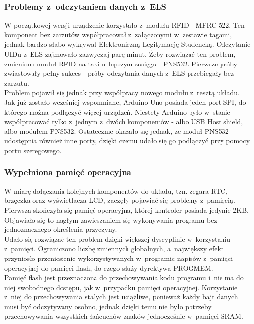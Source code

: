 \documentclass[declaration,shortabstract, mgr]{iithesis}
\begin{document}
\subsubsection{Problemy z~odczytaniem danych z~ELS}
\indent W początkowej wersji urządzenie korzystało z~modułu RFID - MFRC-522. Ten komponent bez zarzutów współpracował z~załączonymi w~zestawie tagami, jednak bardzo słabo wykrywał Elektroniczną Legitymację Studencką. Odczytanie UIDu z~ELS zajmowało zazwyczaj parę minut. Żeby rozwiązać ten problem, zmieniono moduł RFID na taki o~lepszym zasięgu - PNS532. Pierwsze próby zwiastowały pełny sukces - próby odczytania danych z~ELS przebiegały bez zarzutu. \\
\indent Problem pojawił się jednak przy współpracy nowego modułu z~resztą układu. Jak już zostało wcześniej wspomniane, Arduino Uno posiada jeden port SPI, do którego można podłączyć więcej urządzeń. Niestety Arduino było w~stanie współpracować tylko z~jednym z~dwóch komponentów - albo USB Host shield, albo modułem PNS532. Ostatecznie okazało się jednak, że moduł PNS532 udostępnia również inne porty, dzięki czemu udało się go podłączyć przy pomocy portu szeregowego.
\subsubsection{Wypełniona pamięć operacyjna}
\indent W miarę dołączania kolejnych komponentów do układu, tzn. zegara RTC, brzęczka oraz wyświetlacza LCD, zaczęły pojawiać się problemy z~pamięcią. \\
\indent Pierwsza skończyła się pamięć operacyjna, której kontroler posiada jedynie 2KB. Objawiało się to nagłym zawieszaniem się wykonywania programu bez jednoznacznego określenia przyczyny.\\
\indent Udało się rozwiązać ten problem dzięki większej dyscyplinie w~korzystaniu z~pamięci. Ograniczono liczbę zmiennych globalnych, a~największy efekt przyniosło przeniesienie wykorzystywanych w~programie napisów z~pamięci operacyjnej do pamięci flash, do czego służy dyrektywa PROGMEM.\\
\indent Pamięć flash jest przeznaczona do przechowywania kodu programu i~nie ma do niej swobodnego dostępu, jak w~przypadku pamięci operacyjnej. Korzystanie z~niej do przechowywania stałych jest uciążliwe, ponieważ każdy bajt danych musi być odczytywany osobno, jednak dzięki temu nie było potrzeby przechowywania wszystkich łańcuchów znaków jednocześnie w~pamięci SRAM.
\end{document}
